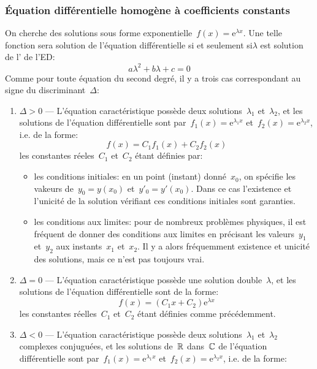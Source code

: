 \subsubsection{Équation différentielle homogène à coefficients constants} On cherche des solutions sous forme exponentielle~$f(x) = \mathrm{e}^{\lambda x}$. Une telle fonction sera solution de l'équation différentielle si et seulement si$\lambda$ est solution de l' de l'ED:
\begin{equation}
a\lambda^2 + b\lambda + c = 0
\end{equation}
Comme pour toute équation du second degré, il y a trois cas correspondant au signe du discriminant~$\Delta$:
\begin{enumerate}
\item$\Delta>0$ --- L'équation caractéristique possède deux solutions~$\lambda_1$ et~$\lambda_2$, et les solutions de l'équation différentielle sont  par~$f_1(x) = \mathrm{e}^{\lambda_1x}$ et~$f_2(x) = \mathrm{e}^{\lambda_2x}$, i.e. de la forme:
\begin{equation}
f(x) = C_1f_1(x) + C_2f_2(x)
\end{equation}
les constantes réeles~$C_1$ et~$C_2$ étant définies par: 
\begin{itemize} 
\item les conditions initiales: en un point (instant) donné~$x_0$, on spécifie les vakeurs de~$y_0=y(x_0)$ et~$y'_0=y'(x_0)$. Dans ce cas l'existence et l'unicité de la solution vérifiant ces conditions initiales sont garanties. 
\item les conditions aux limites: pour de nombreux problèmes physiques, il est fréquent de donner des conditions aux limites en précisant les valeurs~$y_1$et~$y_2$ aux instants~$x_1$ et~$x_2$. Il y a alors fréquemment existence et unicité des solutions, mais ce n'est pas toujours vrai. 
\end{itemize} 
\item$\Delta=0$ --- L'équation caractéristique possède une solution double~$\lambda$, et les solutions de l'équation différentielle sont de la forme:
\begin{equation}
f(x) = (C_1 x + C_2)\mathrm{e}^{\lambda x}
\end{equation}
les constantes réelles~$C_1$ et~$C_2$ étant définies comme précédemment. 
\item$\Delta<0$ --- L'équation caractéristique possède deux solutions~$\lambda_1$ et~$\lambda_2$ complexes conjuguées, et les solutions de~$\mathbb R$ dans~$\mathbb C$ de l'équation différentielle sont  par~$f_1(x) = \mathrm{e}^{\lambda_1x}$ et~$f_2(x) = \mathrm{e}^{\lambda_2x}$, i.e. de la forme:

\end{enumerate}
